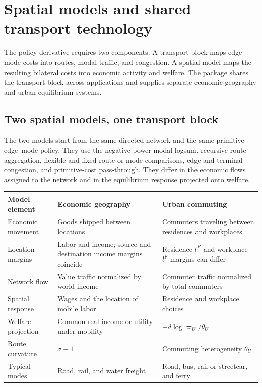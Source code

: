 \section{Spatial models and shared transport technology}
\label{ch:equilibrium}

The policy derivative requires two components. A transport block maps
edge--mode costs into routes, modal traffic, and congestion. A spatial model
maps the resulting bilateral costs into economic activity and welfare. The
package shares the transport block across applications and supplies separate
economic-geography and urban equilibrium systems.

\subsection{Two spatial models, one transport block}

The two models start from the same directed network and the same primitive
edge--mode policy. They use the negative-power modal logsum, recursive route
aggregation, flexible and fixed route or mode comparisons, edge and terminal
congestion, and primitive-cost pass-through. They differ in the economic
flows assigned to the network and in the equilibrium response projected onto
welfare.

\begin{longtable}{L{0.20\textwidth}L{0.35\textwidth}L{0.35\textwidth}}
\toprule
Model element & Economic geography & Urban commuting \\
\midrule
\endhead
Economic movement & Goods shipped between locations & Commuters traveling
between residences and workplaces \\
Location margins & Labor and income; source and destination income margins
coincide & Residence \(l^R\) and workplace \(l^F\) margins can differ \\
Network flow & Value traffic normalized by world income & Commuter traffic
normalized by total commuters \\
Spatial response & Wages and the location of mobile labor & Residence and
workplace choices \\
Welfare projection & Common real income or utility under mobility &
\(-d\log\varpi_U/\theta_U\) \\
Route curvature & \(\sigma-1\) & Commuting heterogeneity \(\theta_U\) \\
Typical modes & Road, rail, and water freight & Road, bus, rail or streetcar,
and ferry \\
\bottomrule
\end{longtable}

